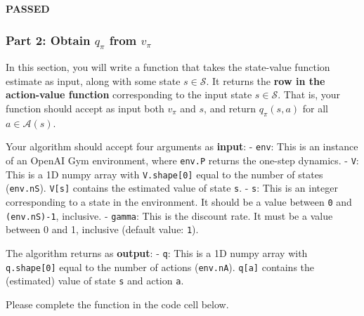\documentclass[11pt]{article}
\begin{document}
    \textbf{{PASSED}}

    
    \subsubsection{\texorpdfstring{Part 2: Obtain \(q_\pi\) from
\(v_\pi\)}{Part 2: Obtain q\_\textbackslash{}pi from v\_\textbackslash{}pi}}\label{part-2-obtain-q_pi-from-v_pi}

In this section, you will write a function that takes the state-value
function estimate as input, along with some state \(s\in\mathcal{S}\).
It returns the \textbf{row in the action-value function} corresponding
to the input state \(s\in\mathcal{S}\). That is, your function should
accept as input both \(v_\pi\) and \(s\), and return \(q_\pi(s,a)\) for
all \(a\in\mathcal{A}(s)\).

Your algorithm should accept four arguments as \textbf{input}: -
\texttt{env}: This is an instance of an OpenAI Gym environment, where
\texttt{env.P} returns the one-step dynamics. - \texttt{V}: This is a 1D
numpy array with \texttt{V.shape{[}0{]}} equal to the number of states
(\texttt{env.nS}). \texttt{V{[}s{]}} contains the estimated value of
state \texttt{s}. - \texttt{s}: This is an integer corresponding to a
state in the environment. It should be a value between \texttt{0} and
\texttt{(env.nS)-1}, inclusive. - \texttt{gamma}: This is the discount
rate. It must be a value between 0 and 1, inclusive (default value:
\texttt{1}).

The algorithm returns as \textbf{output}: - \texttt{q}: This is a 1D
numpy array with \texttt{q.shape{[}0{]}} equal to the number of actions
(\texttt{env.nA}). \texttt{q{[}a{]}} contains the (estimated) value of
state \texttt{s} and action \texttt{a}.

Please complete the function in the code cell below.
\end{document}
